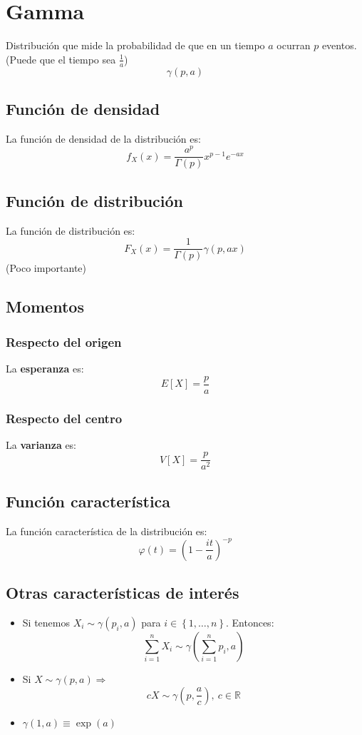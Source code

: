 \section{Gamma}
\label{sec:gamma}
Distribución que mide la probabilidad de que en un tiempo $a$ ocurran $p$ eventos. (Puede que el tiempo sea $\frac{1}{a}$)
\[
\boxed{\gamma\left( p, a \right)}
\]

\subsection{Función de densidad}
La función de densidad de la distribución es:
\[
f_X \left( x \right) = \frac{a^p}{\Gamma\left( p \right)} x^{p - 1} e^{-ax}
\]

\subsection{Función de distribución}
La función de distribución es:
\[
F_X\left( x \right) = \frac{1}{\Gamma\left( p \right)} \gamma\left( p, ax \right)
\]
(Poco importante)

\subsection{Momentos}

\subsubsection*{Respecto del origen}
La \textbf{esperanza} es: 
\[
    E\left[ X \right] = \frac{p}{a}
\]
\subsubsection*{Respecto del centro}
La \textbf{varianza} es:
\[
    V\left[ X \right] = \frac{p}{a^2}
\]

\subsection{Función característica}
La función característica de la distribución es:
\[
\varphi\left( t \right) = \left( 1 - \frac{it}{a} \right)^{-p}
\]

\subsection{Otras características de interés}
\begin{itemize}
    \item Si tenemos $X_i \sim \gamma\left( p_i, a \right)$ para $i \in \left\{ 1, \ldots, n \right\}$. Entonces:
    \[
    \sum_{i=1}^{n} X_i \sim \gamma\left( \sum_{i=1}^{n} p_i, a \right) 
    \]
    \item Si $X \sim \gamma\left( p, a \right) \Rightarrow$
    \[
    c X \sim \gamma\left( p, \frac{a}{c} \right),\ c \in \mathbb{R}
    \]
    \item $\gamma\left( 1, a \right) \equiv \exp\left( a \right)$
\end{itemize}
